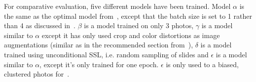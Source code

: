 \documentclass[10pt,twocolumn,letterpaper]{article}
\begin{document}
For comparative evaluation, five different models have been trained. Model $\alpha$ is the same as the optimal model from~\cite{sslUMAP}, except that the batch size is set to 1 rather than 4 as discussed in~. $\beta$ is a model trained on only 3 photos, $\gamma$ is a model similar to $\alpha$ except it has only used crop and color distortions as image augmentations (similar as in the recommended section from~\cite{simCLR}), $\delta$ is a model trained using unconditional \gls{SSL}, i.e. random sampling of slides and $\epsilon$ is a model similar to $\alpha$, except it's only trained for one epoch. $\epsilon$ is only used to a biased, clustered photos for~.

\end{document}
